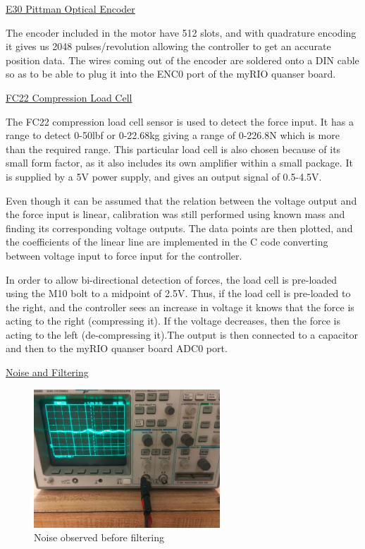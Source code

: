 \vspace{.167in}
\noindent\underline{E30 Pittman Optical Encoder}\par
\vspace{.08in}
The encoder included in the motor have 512 slots, and with quadrature encoding it gives us 2048 pulses/revolution allowing the controller to get an accurate position data. The wires coming out of the encoder are soldered onto a DIN cable so as to be able to plug it into the ENC0 port of the myRIO quanser board.\par 
\vspace{.167in}
\noindent\underline{FC22 Compression Load Cell}\par
\vspace{.08in}
The FC22 compression load cell sensor is used to detect the force input. It has a range to detect 0-50lbf or 0-22.68kg giving a range of 0-226.8N which is more than the required range. This particular load cell is also chosen because of its small form factor, as it also includes its own amplifier within a small package. It is supplied by a 5V power supply, and gives an output signal of 0.5-4.5V. \par
Even though it can be assumed that the relation between the voltage output and the force input is linear, calibration was still performed using known mass and finding its corresponding voltage outputs. The data points are then plotted, and the coefficients of the linear line are implemented in the C code converting between voltage input to force input for the controller. \par
In order to allow bi-directional detection of forces, the load cell is pre-loaded using the M10 bolt to a midpoint of 2.5V. Thus, if the load cell is pre-loaded to the right, and the controller sees an increase in voltage it knows that the force is acting to the right (compressing it). If the voltage decreases, then the force is acting to the left (de-compressing it).The output is then connected to a capacitor and then to the myRIO quanser board ADC0 port. \par
\vspace{.167in}
\noindent\underline{Noise and Filtering}\par
\vspace{.08in}
\begin{figure}[ht]
\begin{center}
\includegraphics[width=2.75in]{Images/Before_Filter.PNG}
\caption{Noise observed before filtering}
\label{B_Filter}
\end{center}
\end{figure}
